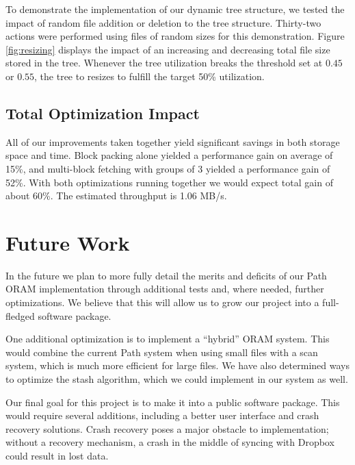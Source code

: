 \documentclass[conference]{IEEEtran}
\begin{document}
To demonstrate the implementation of our dynamic tree structure, we tested the impact of random file addition or deletion to the tree structure. Thirty-two actions were performed using files of random sizes for this demonstration. Figure \ref{fig:resizing} displays the impact of an increasing and decreasing total file size stored in the tree. Whenever the tree utilization breaks the threshold set at $0.45$ or $0.55$, the tree to resizes to fulfill the target 50\% utilization.

\subsection{Total Optimization Impact}

All of our improvements taken together yield significant savings in both storage space and time. Block packing alone yielded a performance gain on average of 15\%, and multi-block fetching with groups of 3 yielded a performance gain of 52\%. With both optimizations running together we would expect total gain of about 60\%. The estimated throughput is 1.06 MB/s. 

\section{Future Work}

In the future we plan to more fully detail the merits and deficits of our Path ORAM implementation through additional tests and, where needed, further optimizations. We believe that this will allow us to grow our project into a full-fledged software package.

One additional optimization is to implement a “hybrid” ORAM system. This would combine the current Path system when using small files with a scan system, which is much more efficient for large files. We have also determined ways to optimize the stash algorithm, which we could implement in our system as well.

Our final goal for this project is to make it into a public software package. This would require several additions, including a better user interface and crash recovery solutions. Crash recovery poses a major obstacle to implementation; without a recovery mechanism, a crash in the middle of syncing with Dropbox could result in lost data.
\end{document}
